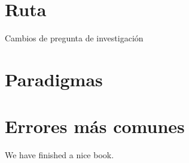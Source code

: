 \documentclass[
]{book}
\begin{document}
\hypertarget{ruta}{%
\chapter{Ruta}\label{ruta}}

Cambios de pregunta de investigación

\hypertarget{paradigmas}{%
\chapter{Paradigmas}\label{paradigmas}}

\hypertarget{errores-muxe1s-comunes}{%
\chapter{Errores más comunes}\label{errores-muxe1s-comunes}}

We have finished a nice book.

  
\end{document}
